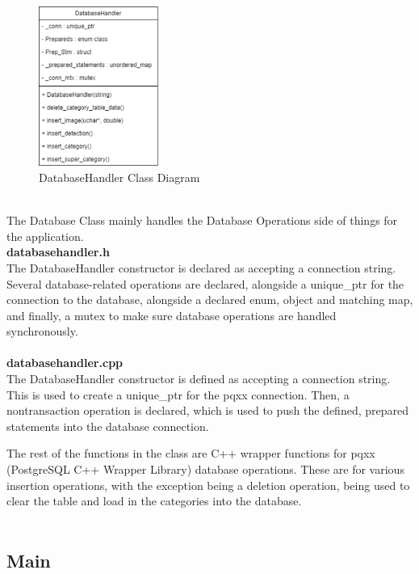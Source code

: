 \documentclass[conference]{IEEEtran}
\begin{document}
\begin{figure}[h]
    \centering
    \includegraphics[width=0.35\textwidth]{images/code_diagrams/databasehandler_uml.eps}
    \caption{DatabaseHandler Class Diagram}
\end{figure}~\\

The Database Class mainly handles the Database Operations side of things for the application.\\


\textbf{databasehandler.h}~\\

The DatabaseHandler constructor is declared as accepting a connection string. Several database-related operations are declared, alongside a unique\_ptr for the connection to the database, alongside a declared enum, object and matching map, and finally, a mutex to make sure database operations are handled synchronously.~\\~\\


\textbf{databasehandler.cpp}~\\

The DatabaseHandler constructor is defined as accepting a connection string. This is used to create a unique\_ptr for the pqxx connection. Then, a nontransaction operation is declared, which is used to push the defined, prepared statements into the database connection. 

The rest of the functions in the class are C++ wrapper functions for pqxx (PostgreSQL C++ Wrapper Library) database operations. These are for various insertion operations, with the exception being a deletion operation, being used to clear the table and load in the categories into the database.~\\~\\

\subsection{Main}
\end{document}
